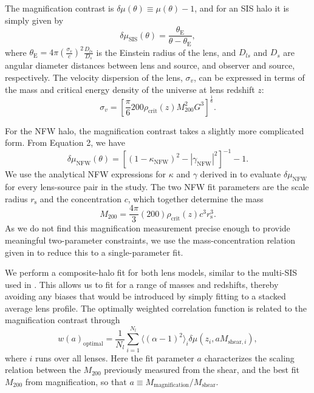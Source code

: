 \documentclass[iop]{emulateapj}
\begin{document}
The magnification contrast is $\delta\mu(\theta) \equiv \mu(\theta) -1$, and for an SIS halo it is simply given by 
\begin{equation}
\delta \mu_{\text{SIS}}(\theta)=\frac{\theta_{\text{E}}}{\theta-\theta_{\text{E}}},
\end{equation}
where $\theta_{\text{E}}=4\pi(\frac{\sigma_v}{c})^2\frac{D_{ls}}{D_s}$ is the Einstein radius of the lens, and $D_{ls}$ and $D_s$ are angular diameter distances between lens and source, and observer and source, respectively. The velocity dispersion of the lens, $\sigma_v$, can be expressed in terms of the mass and critical energy density of the universe at lens redshift $z$:
\begin{equation}
\sigma_v=\left[ \frac{\pi}{6}200\rho_{\text{crit}}(z)M_{200}^2 G^3 \right]^\frac{1}{6} .
\end{equation}

For the NFW halo, the magnification contrast takes a slightly more complicated form. From Equation 2, we have
\begin{equation}
\delta\mu_{\text{NFW}}(\theta)=\left[ (1-\kappa_{\text{NFW}})^2 - \left|\gamma_{\text{NFW}}\right|^2 \right]^{-1} -1.
\end{equation}
We use the analytical NFW expressions for $\kappa$ and $\gamma$ derived in \citet{WrightBrainerd00} to evaluate $\delta\mu_{\text{NFW}}$ for every lens-source pair in the study. The two NFW fit parameters are the scale radius $r_{\text{s}}$ and the concentration $c$, which together determine the mass
\begin{equation}
M_{200}=\frac{4\pi}{3}(200)\rho_{\text{crit}}(z)c^3r_{\text{s}}^3 .
\end{equation}
As we do not find this magnification measurement precise enough to provide meaningful two-parameter constraints, we use the mass-concentration relation given in \citet{Munoz11} to reduce this to a single-parameter fit.

We perform a composite-halo fit for both lens models, similar to the multi-SIS used in \citet{Hildebrandt11}. This allows us to fit for a range of masses and redshifts, thereby avoiding any biases that would be introduced by simply fitting to a stacked average lens profile. The optimally weighted correlation function is related to the magnification contrast through
\begin{equation}
w(a)_{\text{optimal}}= \frac{1}{N_{l}}\sum_{i=1}^{N_{l}} \langle (\alpha -1)^2 \rangle_i \delta \mu(z_i, aM_{\text{shear},i}),
\end{equation}
where $i$ runs over all lenses. Here the fit parameter $a$ characterizes the scaling relation between the $M_{200}$ previously measured from the shear, and the best fit $M_{200}$ from magnification, so that $a \equiv M_{\text{magnification}}/M_{\text{shear}}$. 
\end{document}
